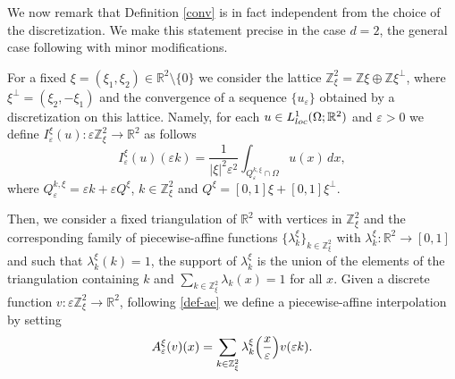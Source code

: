 \documentclass[10pt,a4paper]{amsart}
\def\e{\varepsilon}
\begin{document}
\begin{remark}\label{indepp}\rm 
We now remark that Definition \ref{conv} is in fact independent from the choice of the discretization. 
We make this statement precise in the case $d=2$, the general case following with minor modifications. 

For a fixed $\xi=(\xi_1,\xi_2)\in\mathbb R^2\setminus\{0\}$
we consider the lattice $\mathbb Z_\xi^2=\mathbb Z \xi \oplus \mathbb Z \xi^\perp$, 
where $\xi^\perp=(\xi_2,-\xi_1)$ and the convergence of a sequence $\{u_\e\}$ obtained by a discretization on this lattice.   
Namely, for each $u\in L^1_{\rm loc}(\Omega; \mathbb R^2)$ and $\e>0$ we define $I^\xi_\e(u)\colon\e\mathbb Z^2_\xi \to\mathbb R^2$ as follows
\begin{equation}
I_\e^\xi(u)(\e k)=
\frac{1}{|\xi|^2\e^2}\int_{Q_\e^{k,\xi}\cap \Omega}u(x)\, dx,
\end{equation}
where $Q_\e^{k,\xi}=\e k+ \e Q^\xi$, $k\in \mathbb Z^2_\xi$ and $Q^\xi=[0,1]\xi+[0,1]\xi^\perp$.    

Then, we consider a fixed triangulation of $\mathbb R^2$ with vertices in $\mathbb Z^2_\xi$ and the corresponding family of piecewise-affine functions $\{\lambda_k^\xi\}_{k\in\mathbb Z^2_\xi}$ with $\lambda_k^\xi\colon\mathbb R^2\to[0,1]$ and such that $\lambda_k^\xi(k)=1$, the support of $\lambda_k^\xi$ is the union of the elements of the triangulation containing $k$ and $\sum_{k\in\mathbb Z^2_\xi}\lambda_k(x)=1$ for all $x$. 
Given a discrete function $v\colon\e \mathbb Z^2_\xi\to\mathbb R^2$, following \eqref{def-ae} we define a piecewise-affine interpolation by setting
\begin{equation}
A_\e^\xi(v)(x)=\sum_{k\in\mathbb Z^2_\xi}\lambda_k^\xi\Big({x\over\e}\Big) v(\e k). 
\end{equation}


\end{remark}
\end{document}
